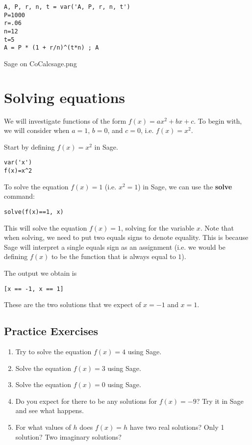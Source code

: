 \begin{codeblock}
\begin{verbatim}
A, P, r, n, t = var('A, P, r, n, t')
P=1000
r=.06
n=12
t=5
A = P * (1 + r/n)^(t*n) ; A
\end{verbatim}
\end{codeblock}

\clearpage
\begin{worksheet}{7}{Sage on CoCalc}{sage.png}

\end{worksheet}
\clearpage

\section{Solving equations}

We will investigate functions of the form $f(x)=ax^2+bx+c$. To begin
with, we will consider when $a=1$, $b=0$, and $c=0$, i.e. $f(x)=x^2$.

Start by defining $f(x)=x^2$ in Sage.

\begin{verbatim}
var('x')
f(x)=x^2
\end{verbatim}

To solve the equation $f(x)=1$ (i.e. $x^2=1$) in Sage, we can use the
\textbf{solve} command:

\begin{verbatim}
solve(f(x)==1, x)
\end{verbatim}

This will solve the equation $f(x)=1$, solving for the variable $x$.
Note that when solving, we need to put two equals signs to denote
equality. This is because Sage will interpret a single equals sign
as an assignment (i.e. we would be defining $f(x)$ to be the function
that is always equal to $1$).

The output we obtain is

\begin{verbatim}
[x == -1, x == 1]
\end{verbatim}

These are the two solutions that we expect of $x=-1$ and $x=1$.

\subsection{Practice Exercises}

\begin{enumerate}
	\item Try to solve the equation $f(x)=4$ using Sage.
	\item Solve the equation $f(x)=3$ using Sage.
	\item Solve the equation $f(x)=0$ using Sage.
	\item Do you expect for there to be any solutions for $f(x)=-9$?
		Try it in Sage and see what happens.
	\item For what values of $h$ does $f(x)=h$ have two real solutions?
		Only 1 solution? Two imaginary solutions?
\end{enumerate}

